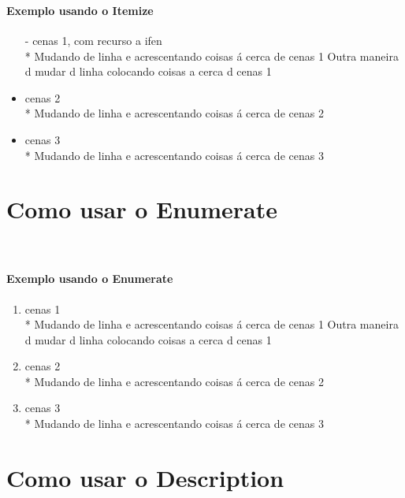 \documentclass[a4paper,11pt]{article}%
\begin{document}
\paragraph{\ \ } 
\paragraph{Exemplo usando o Itemize} 
\begin{itemize}
	\item[-] cenas 1, com recurso a ifen
	\\* Mudando de linha e acrescentando coisas á cerca de cenas 1
	\newline Outra maneira d mudar d linha colocando coisas a cerca d cenas 1
	\item cenas 2
	\\* Mudando de linha e acrescentando coisas á cerca de cenas 2
	\item cenas 3
	\\* Mudando de linha e acrescentando coisas á cerca de cenas 3
\end{itemize}

\newpage
\section{Como usar o Enumerate}
\paragraph{\ \ } 
\paragraph{Exemplo usando o Enumerate}
\begin{enumerate}
	\item cenas 1
	\\* Mudando de linha e acrescentando coisas á cerca de cenas 1
	\newline Outra maneira d mudar d linha colocando coisas a cerca d cenas 1
	\item cenas 2
	\\* Mudando de linha e acrescentando coisas á cerca de cenas 2
	\item cenas 3
	\\* Mudando de linha e acrescentando coisas á cerca de cenas 3
\end{enumerate}

\newpage
\section{Como usar o Description}
\end{document}
